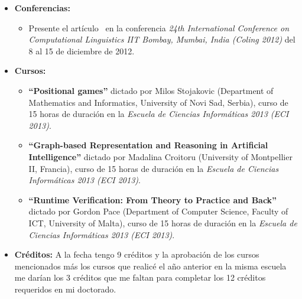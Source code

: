 \begin{itemize}
\item \textbf{Conferencias:}
\begin{itemize}
\item Presente el art\'iculo~\cite{arec:2012:coling12} en la conferencia \emph{24th International Conference on Computational Linguistics IIT Bombay, Mumbai, India (Coling 2012)} del 8 al 15 de diciembre de 2012.
\end{itemize}
\item \textbf{Cursos:}
\begin{itemize}
\item \textbf{``Positional games''} dictado por Milos Stojakovic (Department of Mathematics and Informatics, University of Novi Sad, Serbia), curso de 15 horas de duraci\'on en la \emph{Escuela de Ciencias Inform\'aticas 2013 (ECI 2013)}.

\item \textbf{``Graph-based Representation and Reasoning in Artificial Intelligence''} dictado por Madalina Croitoru (University of Montpellier II, Francia), curso de 15 horas de duraci\'on en la \emph{Escuela de Ciencias Inform\'aticas 2013 (ECI 2013)}.

\item \textbf{``Runtime Verification: From Theory to Practice and Back''} dictado por Gordon Pace (Department  of  Computer  Science,  Faculty  of  ICT,  University  of  Malta), curso de 15 horas de duraci\'on en la \emph{Escuela de Ciencias Inform\'aticas 2013 (ECI 2013)}.
\end{itemize}

\item  \textbf{Cr\'editos:} 
A la fecha tengo 9 cr\'editos y la aprobaci\'on de los cursos mencionados m\'as los cursos que realic\'e el a\~no anterior en la misma escuela me dar\'ian los 3 cr\'editos que me faltan para completar los 12 cr\'editos requeridos en mi doctorado.


\end{itemize}




